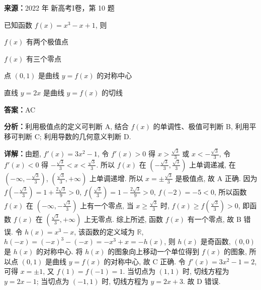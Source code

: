 \begin{question}[points=5]
\textbf{来源：}2022 年 新高考I卷，第 10 题\par
已知函数 $f(x) = x^3 - x + 1$, 则
\begin{choices}
  \item $f(x)$ 有两个极值点
  \item $f(x)$ 有三个零点
  \item 点 $(0,1)$ 是曲线 $y = f(x)$ 的对称中心
  \item 直线 $y = 2x$ 是曲线 $y = f(x)$ 的切线
\end{choices}
\begin{solution}
\textbf{答案：}AC

\textbf{分析：}利用极值点的定义可判断 A, 结合 $f(x)$ 的单调性、极值可判断 B, 利用平移可判断 C; 利用导数的几何意义判断 D.

\textbf{详解：}由题, $f'(x) = 3x^2 - 1$, 令 $f'(x) > 0$ 得 $x > \frac{\sqrt{3}}{3}$ 或 $x < -\frac{\sqrt{3}}{3}$, 令 $f'(x) < 0$ 得 $-\frac{\sqrt{3}}{3} < x < \frac{\sqrt{3}}{3}$. 所以 $f(x)$ 在 $(-\frac{\sqrt{3}}{3}, \frac{\sqrt{3}}{3})$ 上单调递减, 在 $(-\infty, -\frac{\sqrt{3}}{3})$, $(\frac{\sqrt{3}}{3}, +\infty)$ 上单调递增. 所以 $x = \pm\frac{\sqrt{3}}{3}$ 是极值点, 故 A 正确. 因为 $f(-\frac{\sqrt{3}}{3}) = 1 + \frac{2\sqrt{3}}{9} > 0$, $f(\frac{\sqrt{3}}{3}) = 1 - \frac{2\sqrt{3}}{9} > 0$, $f(-2) = -5 < 0$, 所以函数 $f(x)$ 在 $(-\infty, -\frac{\sqrt{3}}{3})$ 上有一个零点, 当 $x \ge \frac{\sqrt{3}}{3}$ 时, $f(x) \ge f(\frac{\sqrt{3}}{3}) > 0$, 即函数 $f(x)$ 在 $(\frac{\sqrt{3}}{3}, +\infty)$ 上无零点. 综上所述, 函数 $f(x)$ 有一个零点, 故 B 错误. 令 $h(x) = x^3 - x$, 该函数的定义域为 $\mathbb{R}$, $h(-x) = (-x)^3 - (-x) = -x^3 + x = -h(x)$, 则 $h(x)$ 是奇函数, $(0,0)$ 是 $h(x)$ 的对称中心. 将 $h(x)$ 的图象向上移动一个单位得到 $f(x)$ 的图象, 所以点 $(0,1)$ 是曲线 $y = f(x)$ 的对称中心, 故 C 正确. 令 $f'(x) = 3x^2 - 1 = 2$, 可得 $x = \pm 1$, 又 $f(1) = f(-1) = 1$. 当切点为 $(1,1)$ 时, 切线方程为 $y = 2x - 1$; 当切点为 $(-1,1)$ 时, 切线方程为 $y = 2x + 3$. 故 D 错误.
\end{solution}
\end{question}

